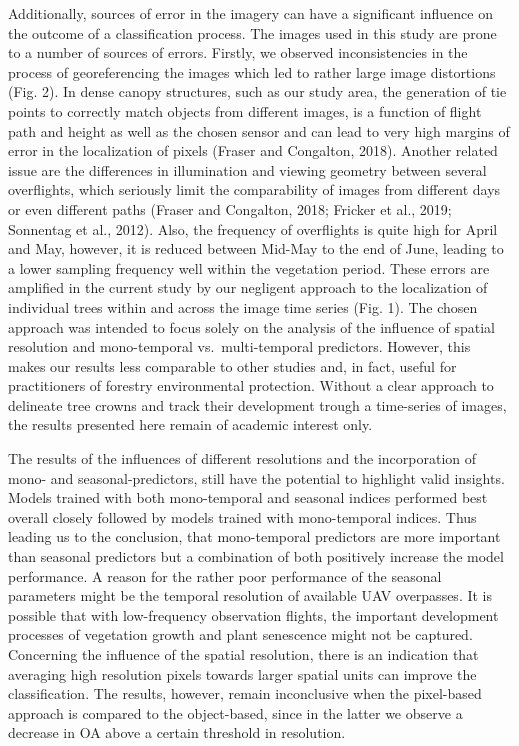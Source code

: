 \documentclass[]{article}
\begin{document}
Additionally, sources of error in the imagery can have a significant
influence on the outcome of a classification process. The images used in
this study are prone to a number of sources of errors. Firstly, we
observed inconsistencies in the process of georeferencing the images
which led to rather large image distortions (Fig. 2). In dense canopy
structures, such as our study area, the generation of tie points to
correctly match objects from different images, is a function of flight
path and height as well as the chosen sensor and can lead to very high
margins of error in the localization of pixels (Fraser and Congalton,
2018). Another related issue are the differences in illumination and
viewing geometry between several overflights, which seriously limit the
comparability of images from different days or even different paths
(Fraser and Congalton, 2018; Fricker et al., 2019; Sonnentag et al.,
2012). Also, the frequency of overflights is quite high for April and
May, however, it is reduced between Mid-May to the end of June, leading
to a lower sampling frequency well within the vegetation period. These
errors are amplified in the current study by our negligent approach to
the localization of individual trees within and across the image time
series (Fig. 1). The chosen approach was intended to focus solely on the
analysis of the influence of spatial resolution and mono-temporal
vs.~multi-temporal predictors. However, this makes our results less
comparable to other studies and, in fact, useful for practitioners of
forestry environmental protection. Without a clear approach to delineate
tree crowns and track their development trough a time-series of images,
the results presented here remain of academic interest only.

The results of the influences of different resolutions and the
incorporation of mono- and seasonal-predictors, still have the potential
to highlight valid insights. Models trained with both mono-temporal and
seasonal indices performed best overall closely followed by models
trained with mono-temporal indices. Thus leading us to the conclusion,
that mono-temporal predictors are more important than seasonal
predictors but a combination of both positively increase the model
performance. A reason for the rather poor performance of the seasonal
parameters might be the temporal resolution of available UAV overpasses.
It is possible that with low-frequency observation flights, the
important development processes of vegetation growth and plant
senescence might not be captured. Concerning the influence of the
spatial resolution, there is an indication that averaging high
resolution pixels towards larger spatial units can improve the
classification. The results, however, remain inconclusive when the
pixel-based approach is compared to the object-based, since in the
latter we observe a decrease in OA above a certain threshold in
resolution.
\end{document}
